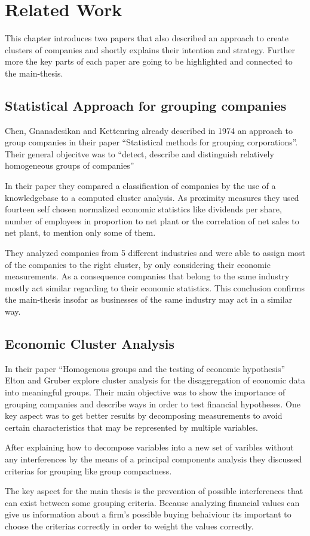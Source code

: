 \section{Related Work}

This chapter introduces two papers that also described an approach to create clusters of companies and
shortly explains their intention and strategy. Further more the key parts of each paper are going to be
highlighted and connected to the main-thesis.

\subsection{Statistical Approach for grouping companies}

Chen, Gnanadesikan and Kettenring \cite{StatisticalGrouping} already described in 1974 an approach to group companies in
their paper ``Statistical methods for grouping corporations''. Their general objecitve was to ``detect, describe and
distinguish relatively homogeneous groups of companies''

In their paper they compared a classification of companies by the use of a knowledgebase to a computed cluster analysis.
As proximity measures they used fourteen self chosen normalized economic statistics like dividends per share, number of employees in proportion
to net plant or the correlation of net sales to net plant, to mention only some of them.

They analyzed companies from 5 different industries and were able to assign most of the companies to the right cluster, by only
considering their economic measurements. As a consequence companies that belong to the same industry mostly act similar
regarding to their economic statistics. This conclusion confirms the main-thesis insofar as businesses of the same industry
may act in a similar way.

\subsection{Economic Cluster Analysis}

In their paper ``Homogenous groups and the testing of economic hypothesis'' Elton and Gruber \cite{EconomicClusterAnalysis}
explore cluster analysis for the disaggregation of economic data into meaningful groups. Their main objective was to
show the importance of grouping companies and describe ways in order to test financial hypotheses.
One key aspect was to get better results by decomposing measurements to avoid certain characteristics that may
be represented by multiple variables.

After explaining how to decompose variables into a new set of varibles without any interferences by the means of a
principal components analysis they discussed criterias for grouping like group compactness.

The key aspect for the main thesis is the prevention of possible interferences that can exist between some grouping criteria.
Because analyzing financial values can give us information about a firm's possible buying behaiviour its important to choose the
criterias correctly in order to weight the values correctly.
